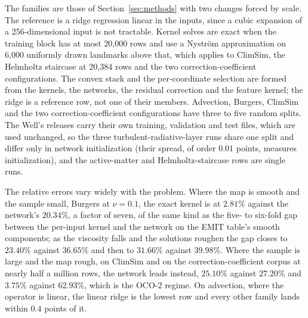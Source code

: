 The families are those of Section~\ref{sec:methods} with two changes forced by scale. The
reference is a ridge regression linear in the inputs, since a cubic expansion of a 256-dimensional
input is not tractable. Kernel solves are exact when the training block has at most 20{,}000 rows
and use a Nystr\"om approximation \cite{nystrom} on 6{,}000 uniformly drawn landmarks above that,
which applies to ClimSim, the Helmholtz staircase at 20{,}384 rows and the two
correction-coefficient configurations. The convex stack and the per-coordinate selection are formed
from the kernels, the networks, the residual correction and the feature kernel; the ridge is a
reference row, not one of their members. Advection, Burgers, ClimSim and the two
correction-coefficient configurations have three to five random splits. The Well's releases carry
their own training, validation and test files, which are used unchanged, so the three
turbulent-radiative-layer runs share one split and differ only in network initialization (their
spread, of order $0.01$ points, measures initialization), and the active-matter and
Helmholtz-staircase rows are single runs.

\begin{table}[t]
\centering

\caption{Ten further configurations: dimensions and run counts (A), reference models (B),
and combinations (C). Errors are mean relative spectral norms in percent, with the
0.05 denominator floor of \eqref{eq:coefficient-floor} for the two RT-coefficient rows.
Spreads are sample standard deviations; the radiative-layer repetitions share one split
and vary initialization, and two rows are single runs. The network budget is 200 epochs
at width 512, except ClimSim (60 at 512) and RT coefficients (120 at 384). The linear
ridge is excluded from the stack; its Helmholtz error is $0.004\%$, rounded in the table.
Kernel solves above 20{,}000 training rows use 6{,}000 Nystr\"om landmarks.}
\label{tab:corpora}
\end{table}

The relative errors vary widely with the problem. Where the map is smooth and the sample small,
Burgers at $\nu = 0.1$, the exact kernel is at $2.81\%$ against the network's $20.34\%$, a factor of
seven, of the same kind as the five- to six-fold gap between the per-input kernel and the network on
the EMIT table's smooth components; as the viscosity falls and the solutions roughen the gap closes
to $23.40\%$ against $36.65\%$ and then to $31.66\%$ against $39.98\%$. Where the sample is large and
the map rough, on ClimSim and on the correction-coefficient corpus at nearly half a million rows, the
network leads instead, $25.10\%$ against $27.20\%$ and $3.75\%$ against $62.93\%$, which is the OCO-2
regime. On advection, where the operator is linear, the linear ridge is the lowest row and every
other family lands within $0.4$ points of it.

